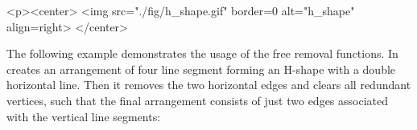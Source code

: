 \lcTex{%
  \setlength{\ArrangementTwoWidthRight}{1.5cm}
  \setlength{\ArrangementTwoWidthLeft}{\ArrangementTwoWidthLineReal}
  \addtolength{\ArrangementTwoWidthLeft}{-\ArrangementTwoWidthRight}
  \begin{minipage}{\ArrangementTwoWidthLeft}
}
\begin{ccHtmlOnly}
  <p><center>
    <img src="./fig/h_shape.gif" border=0 alt="h_shape" align=right>
  </center>
\end{ccHtmlOnly}
The following example demonstrates the usage of the free removal
functions. In creates an arrangement of four line segment forming
an H-shape with a double horizontal line. Then it removes the two
horizontal edges and clears all redundant vertices, such that the
final arrangement consists of just two edges associated with the
vertical line segments:

